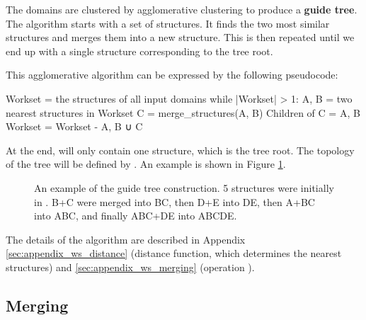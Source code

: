 \documentclass{article}
\begin{document}
The domains are clustered by agglomerative clustering to produce a \textbf{guide
tree}. The algorithm starts with a set of structures. It finds the two 
most similar structures and merges them into a new structure. This is then
repeated until we end up with a single structure corresponding
to the tree root.

This agglomerative algorithm can be expressed by the following
pseudocode:

\begin{codeblock}
    Workset = { the structures of all input domains }  
    while |Workset| > 1:  
        A, B = two nearest structures in Workset
        C = merge_structures(A, B)  
        Children of C = {A, B}
        Workset = Workset - {A, B} ∪ {C}
\end{codeblock}

At the end,  will only contain one structure,
which is the tree root. The topology of the tree will be defined by
. An example is shown in Figure \ref{fig:guide_tree}.

\begin{figure}[h!]
  \caption{An example of the guide tree construction. 5 structures were initially in .
  B+C were merged into BC, then D+E into DE, then A+BC into ABC, and finally ABC+DE into ABCDE.}
  \label{fig:guide_tree}
\end{figure}

The details of the algorithm are described in Appendix \ref{sec:appendix_ws_distance} 
(distance function, which determines the nearest structures) 
and \ref{sec:appendix_ws_merging} (operation ).



\subsection{Merging}
\label{sec:merging}
\end{document}
